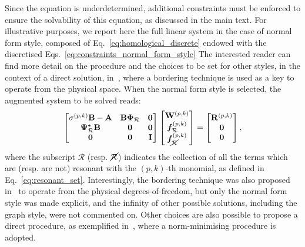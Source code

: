 \documentclass[%
reprint,
superscriptaddress,
 amsmath,amssymb,
 aps,
 pre
]{revtex4-2}
\begin{document}
Since the equation is underdetermined, additional constraints must be enforced to ensure the solvability of this equation, as discussed in the main text. For illustrative purposes, we report here the full linear system in the case of normal form style, composed of Eq.~\eqref{eq:homological_discrete} endowed with the discretised Eqs.~\eqref{eq:constraints_normal_form_style}
The interested reader can find more detail on the procedure and the choices to be set for other styles, in the context of a direct solution, in~\cite{vizza2023superharm}, where a bordering technique is used as a key to operate from the physical space. When the normal form style is selected, the augmented system to be solved reads:
\begin{equation}
    \begin{bmatrix}
    \sigma^{(p,k)} \mathbf{B}- \mathbf{A} &   \mathbf{B} \boldsymbol{\Phi}_{\mathcal{R}} & \mathbf{0}
    \\
    \boldsymbol{\Psi}_{\mathcal{R}}^\star\mathbf{B} &  \mathbf{0}  & \mathbf{0} \\
    \mathbf{0}    &   \mathbf{0}      & \mathbf{I}
    \end{bmatrix}
   \begin{bmatrix}   \mathbf{W}^{(p,k)}\\
   \boldsymbol{f}^{(p,k)}_{\mathcal{R}}\\
   \boldsymbol{f}^{(p,k)}_{\cancel{\mathcal{R}}}
    \end{bmatrix}
    =
    \begin{bmatrix}
    \mathbf{R}^{(p,k)}\\
    \mathbf{0} \\
    \mathbf{0}
    \end{bmatrix},
\end{equation}
where the subscript $\mathcal{R}$ (resp. $\cancel{\mathcal{R}}$) indicates the collection of all the terms which are (resp. are not) resonant with the $(p,k)$-th monomial, as defined in Eq.~\eqref{eq:resonant_set}. Interestingly, the bordering technique was also proposed in~\cite{Carini2015} to operate from the physical degrees-of-freedom, but only the normal form style was made explicit, and the infinity of other possible solutions, including the graph style, were not commented on. Other choices are also possible to propose a direct procedure, as exemplified in~\cite{JAIN2021How}, where a norm-minimising procedure is adopted.



\end{document}
